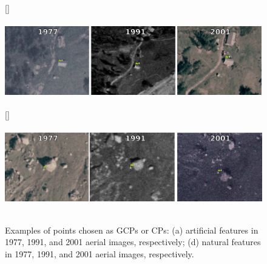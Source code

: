 \begin{figure}
    \centering
    \subcaptionbox{\label{fig:2:gcp_examples:artificial}}[\textwidth]{
        \includegraphics[height=4cm]{artificial_gcps}
    } \\
    \subcaptionbox{\label{fig:2:gcp_examples:natural}}[\textwidth]{
        \includegraphics[height=4cm]{natural_gcps}
    }
    \caption{Examples of points chosen as GCPs or CPs: (a) artificial features in 1977, 1991, and 2001 aerial images, respectively; (d) natural features in 1977, 1991, and 2001 aerial images, respectively.}
    \label{fig:2:gcp_examples}
\end{figure}

